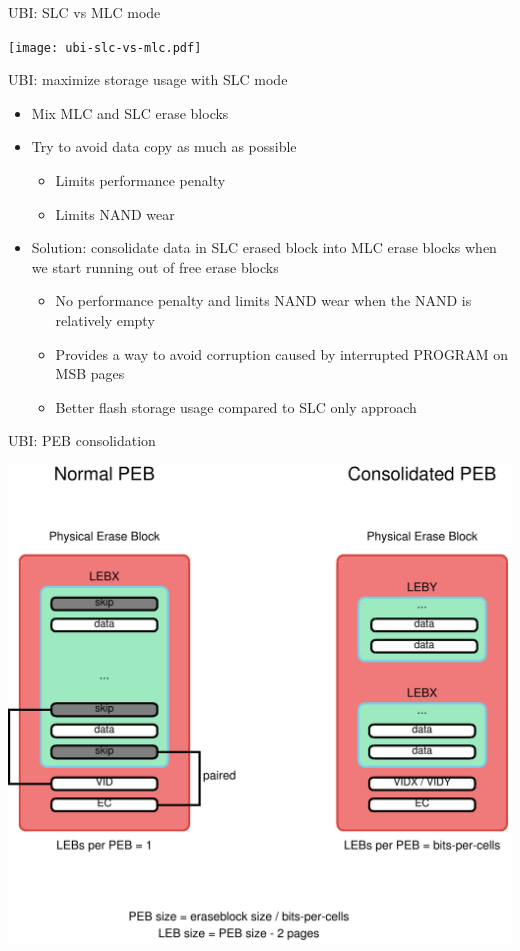 \documentclass[obeyspaces,spaces,hyphens,dvipsnames]{beamer}
\begin{document}
\begin{frame}{UBI: SLC vs MLC mode}
  \begin{center}
    \texttt{[image: ubi-slc-vs-mlc.pdf]}
  \end{center}
\end{frame}

\begin{frame}{UBI: maximize storage usage with SLC mode}
  \begin{itemize}
  \item Mix MLC and SLC erase blocks
  \item Try to avoid data copy as much as possible
    \begin{itemize}
    \item Limits performance penalty
    \item Limits NAND wear
    \end{itemize}
  \item Solution: consolidate data in SLC erased block into MLC erase
        blocks when we start running out of free erase blocks
    \begin{itemize}
    \item No performance penalty and limits NAND wear when the NAND
          is relatively empty
    \item Provides a way to avoid corruption caused by interrupted
          PROGRAM on MSB pages
    \item Better flash storage usage compared to SLC only approach
    \end{itemize}
  \end{itemize}
\end{frame}

\begin{frame}{UBI: PEB consolidation}
  \begin{center}
    \includegraphics[scale=0.3]{ubi-peb-consolidation.pdf}
  \end{center}
\end{frame}
\end{document}
